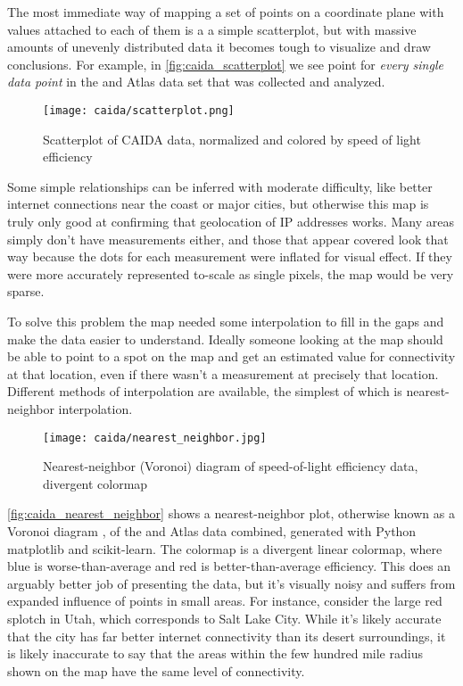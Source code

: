 The most immediate way of mapping a set of points on a coordinate plane with values attached to each of them is a a simple
scatterplot, but with massive amounts of unevenly distributed data it becomes tough to visualize and draw conclusions. For example, in \autoref{fig:caida_scatterplot} we see point for \textit{every single data point} in the \caida and \ripe Atlas data set that was collected and analyzed.

\begin{figure}[H]
    \centering
    \texttt{[image: caida/scatterplot.png]}
    \caption{Scatterplot of CAIDA data, normalized and colored by speed of light efficiency}
    \label{fig:caida_scatterplot}
\end{figure}

Some simple relationships can be inferred with moderate difficulty, like better internet connections near the coast or major cities, but otherwise this map is truly only good at confirming that geolocation of IP addresses works. Many areas simply don't have measurements either, and those that appear covered look that way because the dots for each measurement were inflated for visual effect. If they were more accurately represented to-scale as single pixels, the map would be very sparse.

To solve this problem the map needed some interpolation to fill in the gaps and make the data easier to understand. Ideally someone looking at the map should be able to point to a spot on the map and get an estimated value for connectivity at that location, even if there wasn't a measurement at precisely that location. Different methods of interpolation are available, the simplest of which is nearest-neighbor interpolation.

\begin{figure}[H]
    \centering
    \texttt{[image: caida/nearest\_neighbor.jpg]}
    \caption{Nearest-neighbor (Voronoi) diagram of speed-of-light efficiency data, divergent colormap}
    \label{fig:caida_nearest_neighbor}
\end{figure}

\autoref{fig:caida_nearest_neighbor} shows a nearest-neighbor plot, otherwise known as a Voronoi diagram \cite{Malhotra2017LoveNeighbors}, of the \caida and \ripe Atlas data combined, generated with Python matplotlib and scikit-learn. The colormap is a divergent linear colormap, where blue is worse-than-average and red is better-than-average efficiency. This does an arguably better job of presenting the data, but it's visually noisy and suffers from expanded influence of points in small areas. For instance, consider the large red splotch in Utah, which corresponds to Salt Lake City. While it's likely accurate that the city has far better internet connectivity than its desert surroundings, it is likely inaccurate to say that the areas within the few hundred mile radius shown on the map have the same level of connectivity.

\FloatBarrier
